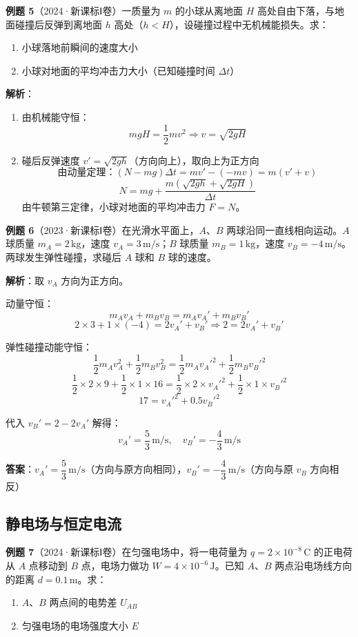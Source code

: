 \textbf{例题 5}（2024·新课标Ⅰ卷）一质量为 $m$ 的小球从离地面 $H$ 高处自由下落，与地面碰撞后反弹到离地面 $h$ 高处（$h < H$），设碰撞过程中无机械能损失。求：
\begin{enumerate}
  \item 小球落地前瞬间的速度大小
  \item 小球对地面的平均冲击力大小（已知碰撞时间 $\Delta t$）
\end{enumerate}

\textbf{解析}：
\begin{enumerate}
  \item 由机械能守恒：
  \[
  mgH = \frac12 mv^2 \Rightarrow v = \sqrt{2gH}
  \]
  \item 碰后反弹速度 $v' = \sqrt{2gh}$（方向向上），取向上为正方向
  \[
  \text{由动量定理：} (N - mg)\Delta t = mv' - (-mv) = m(v' + v)
  \]
  \[
  N = mg + \frac{m(\sqrt{2gh} + \sqrt{2gH})}{\Delta t}
  \]
  由牛顿第三定律，小球对地面的平均冲击力 $F = N$。
\end{enumerate}

\vspace{1em}

\textbf{例题 6}（2023·新课标Ⅰ卷）在光滑水平面上，$A$、$B$ 两球沿同一直线相向运动。$A$ 球质量 $m_A = 2\,\text{kg}$，速度 $v_A = 3\,\text{m/s}$；$B$ 球质量 $m_B = 1\,\text{kg}$，速度 $v_B = -4\,\text{m/s}$。两球发生弹性碰撞，求碰后 $A$ 球和 $B$ 球的速度。

\textbf{解析}：取 $v_A$ 方向为正方向。

动量守恒：
\[
m_Av_A + m_Bv_B = m_Av_A' + m_Bv_B'
\]
\[
2\times 3 + 1\times (-4) = 2v_A' + v_B' \Rightarrow 2 = 2v_A' + v_B'
\]

弹性碰撞动能守恒：
\[
\frac12 m_Av_A^2 + \frac12 m_Bv_B^2 = \frac12 m_Av_A'^2 + \frac12 m_Bv_B'^2
\]
\[
\frac12\times2\times9 + \frac12\times1\times16 = \frac12\times2\times v_A'^2 + \frac12\times1\times v_B'^2
\]
\[
17 = v_A'^2 + 0.5 v_B'^2
\]

代入 $v_B' = 2 - 2v_A'$ 解得：
\[
v_A' = \frac{5}{3}\,\text{m/s},\quad v_B' = -\frac{4}{3}\,\text{m/s}
\]

\textbf{答案}：$v_A' = \dfrac{5}{3}\,\text{m/s}$（方向与原方向相同），$v_B' = -\dfrac{4}{3}\,\text{m/s}$（方向与原 $v_B$ 方向相反）

\subsection{静电场与恒定电流}

\textbf{例题 7}（2024·新课标Ⅰ卷）在匀强电场中，将一电荷量为 $q = 2\times10^{-8}\,\text{C}$ 的正电荷从 $A$ 点移动到 $B$ 点，电场力做功 $W = 4\times10^{-6}\,\text{J}$。已知 $A$、$B$ 两点沿电场线方向的距离 $d = 0.1\,\text{m}$。求：
\begin{enumerate}
  \item $A$、$B$ 两点间的电势差 $U_{AB}$
  \item 匀强电场的电场强度大小 $E$
\end{enumerate}

